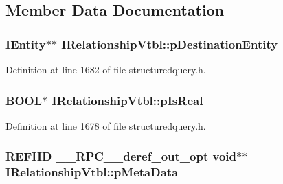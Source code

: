 \subsection{Member Data Documentation}
\subsubsection[{\texorpdfstring{p\+Destination\+Entity}{pDestinationEntity}}]{ {\bf I\+Entity}$\ast$$\ast$ I\+Relationship\+Vtbl\+::p\+Destination\+Entity}\hypertarget{struct_i_relationship_vtbl_a7f111304052a11804343994cba12c0d9}{}\label{struct_i_relationship_vtbl_a7f111304052a11804343994cba12c0d9}


Definition at line 1682 of file structuredquery.\+h.

\subsubsection[{\texorpdfstring{p\+Is\+Real}{pIsReal}}]{ {\bf B\+O\+OL}$\ast$ I\+Relationship\+Vtbl\+::p\+Is\+Real}\hypertarget{struct_i_relationship_vtbl_aa608b834a180c0b59262d561ced4b46a}{}\label{struct_i_relationship_vtbl_aa608b834a180c0b59262d561ced4b46a}


Definition at line 1678 of file structuredquery.\+h.

\subsubsection[{\texorpdfstring{p\+Meta\+Data}{pMetaData}}]{ {\bf R\+E\+F\+I\+ID} {\bf \+\_\+\+\_\+\+R\+P\+C\+\_\+\+\_\+deref\+\_\+out\+\_\+opt} {\bf void}$\ast$$\ast$ I\+Relationship\+Vtbl\+::p\+Meta\+Data}\hypertarget{struct_i_relationship_vtbl_a8039e13a6d31b68141550c5e00475c49}{}\label{struct_i_relationship_vtbl_a8039e13a6d31b68141550c5e00475c49}


